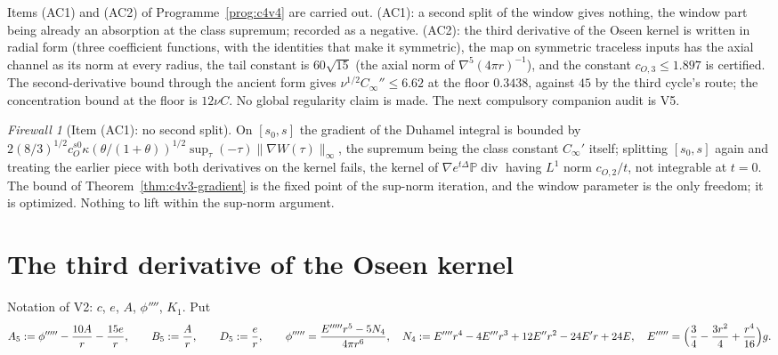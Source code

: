 \documentclass[11pt]{article}
\newcommand{\PP}{\mathbb P}
\theoremstyle{plain}
\theoremstyle{definition}
\theoremstyle{remark}
\newtheorem{firewall}[theorem]{Firewall}
\begin{document}
Items (AC1) and (AC2) of Programme~\ref{prog:c4v4} are carried out.
(AC1): a second split of the window gives nothing, the window part
being already an absorption at the class supremum; recorded as a
negative.  (AC2): the third derivative of the Oseen kernel is written
in radial form (three coefficient functions, with the identities that
make it symmetric), the map on symmetric traceless inputs has the
axial channel as its norm at every radius, the tail constant is
\(60\sqrt{15}\) (the axial norm of \(\nabla^5(4\pi r)^{-1}\)), and the constant
\(c_{O,3}\le1.897\) is certified.  The second-derivative bound through the
ancient form gives \(\nu^{1/2}C_\infty''\le6.62\) at the floor \(0.3438\), against \(45\) by
the third cycle's route; the concentration bound at the floor is
\(12\nu C\).  No global regularity claim is made.  The next compulsory
companion audit is V5.

\begin{firewall}[Item (AC1): no second split]
\label{fw:c4v4-no-second-split}
On \([s_0,s]\) the gradient of the Duhamel integral is bounded by
\(2(8/3)^{1/2}c_O^{s0}\kappa(\theta/(1+\theta))^{1/2}\sup_\tau(-\tau)\|\nabla W(\tau)\|_\infty\), the supremum being the
class constant \(C_\infty'\) itself; splitting \([s_0,s]\) again and treating the
earlier piece with both derivatives on the kernel fails, the kernel
of \(\nabla e^{t\Delta}\PP\operatorname{div}\) having \(L^1\) norm \(c_{O,2}/t\), not integrable at \(t=0\).  The
bound of Theorem~\ref{thm:c4v3-gradient} is the fixed point of the
sup-norm iteration, and the window parameter is the only freedom;
it is optimized.  Nothing to lift within the sup-norm argument.
\end{firewall}

\section{The third derivative of the Oseen kernel}
\label{sec:c4v4-radial}

Notation of V2: \(c\), \(e\), \(A\), \(\phi''''\), \(K_1\).  Put
\begin{equation}
 A_5:=\phi'''''-\frac{10A}r-\frac{15e}r,\qquad B_5:=\frac Ar,\qquad D_5:=\frac er,\qquad
 \phi'''''=\frac{E'''''r^5-5N_4}{4\pi r^6},\quad N_4:=E''''r^4-4E'''r^3+12E''r^2-24E'r+24E,\quad
 E'''''=\Bigl(\frac34-\frac{3r^2}4+\frac{r^4}{16}\Bigr)g .
 \label{eq:c4v4-coefficients}
\end{equation}
\end{document}
